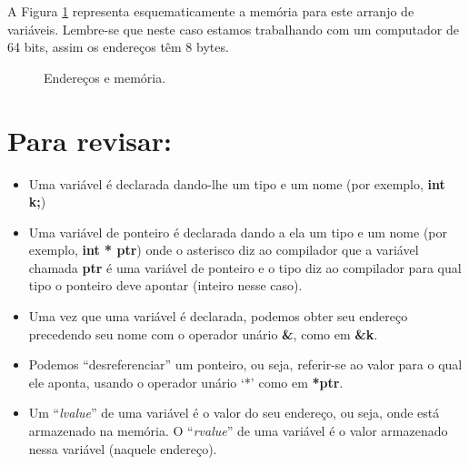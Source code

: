 A Figura \ref{enderecos} representa esquematicamente a memória para este arranjo de variáveis. Lembre-se que neste caso estamos trabalhando com um computador de 64 bits, assim os endereços têm 8 bytes. 

\begin{figure}[ht]
	\begin{center}
		
		\caption{Endereços e memória.}
		\label{fig:esquemamemoria}
	\end{center}
\label{enderecos}
\end{figure}


\section*{Para revisar:}
\begin{itemize}
	\item Uma variável é declarada dando-lhe um tipo e um nome (por exemplo, \textbf{int k;})
	\item Uma variável de ponteiro é declarada dando a ela um tipo e um nome (por exemplo, \textbf{int * ptr}) onde o asterisco diz ao compilador que a variável chamada \textbf{ptr} é uma variável de ponteiro e o tipo diz ao compilador para qual tipo o ponteiro deve apontar (inteiro nesse caso).
	\item Uma vez que uma variável é declarada, podemos obter seu endereço precedendo seu nome com o operador unário \textbf{\&}, como em \textbf{\&k}.
	\item Podemos ``desreferenciar'' um ponteiro, ou seja, referir-se ao valor para o qual ele aponta, usando o operador unário `*' como em \textbf{*ptr}.
	\item Um ``\textit{lvalue}'' de uma variável é o valor do seu endereço, ou seja, onde está armazenado na memória. O ``\textit{rvalue}'' de uma variável é o valor armazenado nessa variável (naquele endereço).
\end{itemize}

